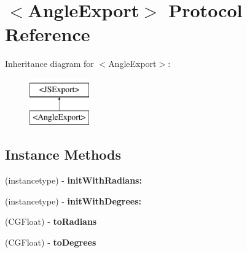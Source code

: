 \hypertarget{protocol_angle_export-p}{}\section{$<$Angle\+Export$>$ Protocol Reference}
\label{protocol_angle_export-p}
Inheritance diagram for $<$Angle\+Export$>$\+:\begin{figure}[H]
\begin{center}
\leavevmode
\includegraphics[height=2.000000cm]{protocol_angle_export-p}
\end{center}
\end{figure}
\subsection*{Instance Methods}
\begin{DoxyCompactItemize}
\item 
\hypertarget{protocol_angle_export-p_afa6bf4a273a0a6f1eedc54ad576cfc1a}{}(instancetype) -\/ {\bfseries init\+With\+Radians\+:}\label{protocol_angle_export-p_afa6bf4a273a0a6f1eedc54ad576cfc1a}

\item 
\hypertarget{protocol_angle_export-p_a2a84d7ed300f2e4c93c5177f9dcc5bdd}{}(instancetype) -\/ {\bfseries init\+With\+Degrees\+:}\label{protocol_angle_export-p_a2a84d7ed300f2e4c93c5177f9dcc5bdd}

\item 
\hypertarget{protocol_angle_export-p_a8f5d551fe9e89c37f35bf2b5fca38272}{}(C\+G\+Float) -\/ {\bfseries to\+Radians}\label{protocol_angle_export-p_a8f5d551fe9e89c37f35bf2b5fca38272}

\item 
\hypertarget{protocol_angle_export-p_a2906d8e731e0a28f37b618330d6db760}{}(C\+G\+Float) -\/ {\bfseries to\+Degrees}\label{protocol_angle_export-p_a2906d8e731e0a28f37b618330d6db760}

\end{DoxyCompactItemize}
